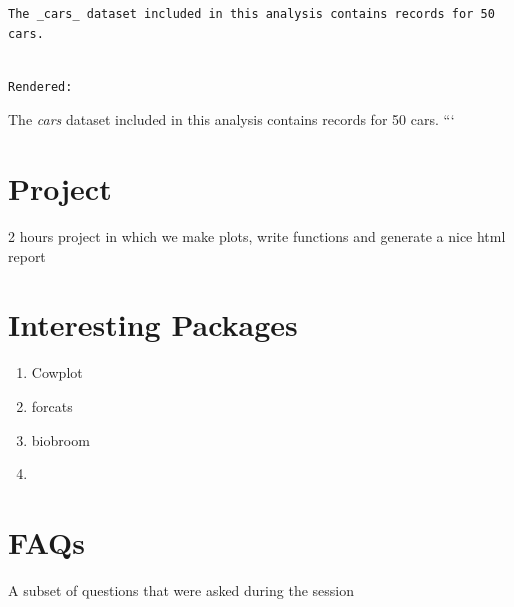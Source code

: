 \documentclass[
]{book}
\begin{document}
\begin{verbatim}
The _cars_ dataset included in this analysis contains records for 50 cars.
\end{verbatim}

\begin{verbatim}

Rendered:
\end{verbatim}

The \emph{cars} dataset included in this analysis contains records for 50 cars.
```

\hypertarget{project}{%
\chapter{Project}\label{project}}

2 hours project in which we make plots, write functions and generate a nice html report

\hypertarget{interesting-packages}{%
\chapter{Interesting Packages}\label{interesting-packages}}

\begin{enumerate}
\def\labelenumi{\arabic{enumi}.}
\item
  Cowplot
\item
  forcats
\item
  biobroom
\item
\end{enumerate}

\hypertarget{faqs}{%
\chapter{FAQs}\label{faqs}}

A subset of questions that were asked during the session

  
\end{document}
